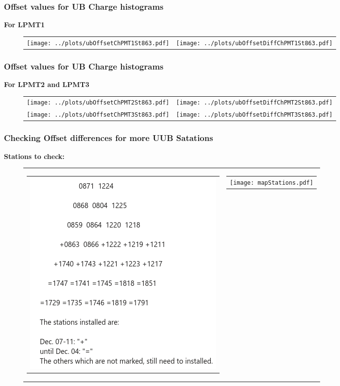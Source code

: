 \documentclass[aspectratio=169]{beamer}
\begin{document}

\begin{frame}
	\frametitle{Offset values for UB Charge histograms}
	{\bf For LPMT1}
	\begin{figure}
		\centering
		\begin{tabularx}{\textwidth}{CC}
			\texttt{[image: ../plots/ubOffsetChPMT1St863.pdf]}
			&
			\texttt{[image: ../plots/ubOffsetDiffChPMT1St863.pdf]}
		\end{tabularx}
	\end{figure}
\end{frame}
			
			
\begin{frame}
	\frametitle{Offset values for UB Charge histograms}
	{\bf For LPMT2 and LPMT3}
	\begin{figure}
		\centering
		\begin{tabularx}{\textwidth}{CC}
			\texttt{[image: ../plots/ubOffsetChPMT2St863.pdf]}
			&
			\texttt{[image: ../plots/ubOffsetDiffChPMT2St863.pdf]}
			\\
			\texttt{[image: ../plots/ubOffsetChPMT3St863.pdf]}
			&
			\texttt{[image: ../plots/ubOffsetDiffChPMT3St863.pdf]}
		\end{tabularx}
	\end{figure}
\end{frame}


\begin{frame}
	\frametitle{Checking Offset differences for more UUB Satations}
	{\bf Stations to check:}
	\begin{figure}
		\centering
		\begin{tabularx}{\textwidth}{CC}
			\begin{tabular}{l}
				\includegraphics[width=.35\textwidth]{listStations.png}
			\end{tabular}
			&
			\begin{tabular}{l}
				\texttt{[image: mapStations.pdf]}
			\end{tabular}
		\end{tabularx}
	\end{figure}
\end{frame}
\end{document}
